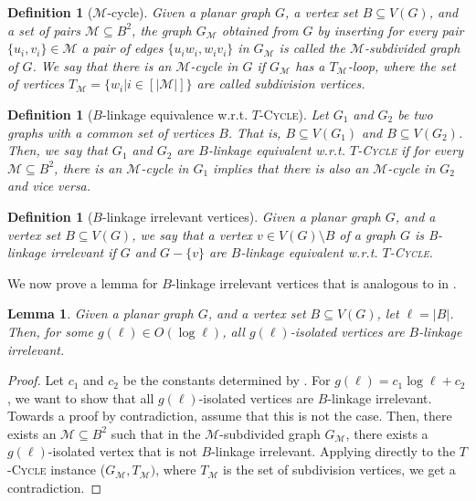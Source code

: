 \documentclass{article}
\newtheorem{lemma}[theorem]{Lemma}
\newtheorem{definition}[theorem]{Definition}
\numberwithin{claimcounter}{lemma}
\newcommand{\tcycle}{$T$-\textsc{Cycle}\xspace}
\begin{document}
\begin{definition}[$\mathcal{M}$-cycle]
     Given a planar graph $G$,  a vertex set $B\subseteq V(G)$, and a set of pairs $\mathcal{M} \subseteq B^2 $, the graph $G_\mathcal{M}$  obtained from $G$ by inserting for every pair $\{ u_i,v_i\} \in \mathcal{M}$ a pair of edges $\{u_iw_i,  w_iv_i\}$ in $G_{\mathcal{M}}$ is called the \emph{$\mathcal{M}$-subdivided graph of $G$}. We say that there is an  $\mathcal{M}$-cycle in $G$ if $G_\mathcal{M}$ has a $T_\mathcal{M}$-loop, where the set of vertices $T_{\mathcal{M}} =  \{w_i | i\in [|\mathcal{M}|]\}$ are called \emph{subdivision vertices}. \end{definition}

\begin{definition}[$B$-linkage equivalence w.r.t. \tcycle]
    Let $G_1$ and $G_2$ be two graphs with a common set of vertices $B$. That is, $B\subseteq V(G_1)$ and $B\subseteq V(G_2)$. Then, we say that $G_1$ and $G_2$ are \emph{$B$-linkage equivalent w.r.t. \tcycle} if for every $\mathcal{M} \subseteq B^2 $, there is an $\mathcal{M}$-cycle in $G_1$ implies that there is also an $\mathcal{M}$-cycle in $G_2$ and vice versa.   
\end{definition}

\begin{definition}[$B$-linkage irrelevant vertices]
 Given a planar graph $G$, and a vertex set $B\subseteq V(G)$, we say that a vertex $v \in V(G) \setminus B$ of a graph $G$ is \emph{B-linkage irrelevant} if $G$ and $G - \{v\}$ are $B$-linkage equivalent w.r.t. \tcycle.    
\end{definition}

We now prove a lemma for $B$-linkage irrelevant vertices that is analogous to   in .

\begin{lemma} \label{L:linkageirrelevant}
    Given a planar graph $G$, and a vertex set $B\subseteq V(G)$, let $\ell = |B|$. Then, for some $g(\ell) \in O(\log \ell)$, all $g(\ell)$-isolated vertices are $B$-linkage irrelevant. 
\end{lemma}
\begin{proof}
 Let $c_1$ and $c_2$ be the constants determined by . For $ g(\ell ) = c_1 \log \ell + c_2$, we want to show that  all   $g(\ell)$-isolated vertices are $B$-linkage irrelevant. Towards a proof by contradiction, assume that this is not the case. Then, there exists an $\mathcal{M} \subseteq B^2$ such that in the $\mathcal{M}$-subdivided graph $G_\mathcal{M}$, there exists a $g(\ell)$-isolated vertex that is not $B$-linkage irrelevant. Applying  directly to the \tcycle instance ($G_\mathcal{M},T_\mathcal{M})$, where $T_\mathcal{M}$ is the set of subdivision vertices, we get a contradiction.
\end{proof}
\end{document}
